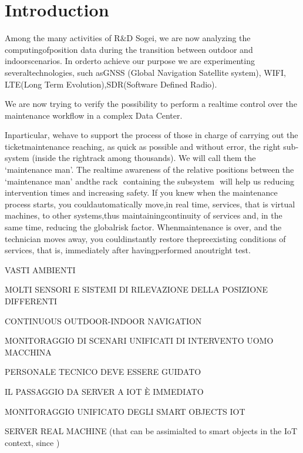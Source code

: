 \section{Introduction}\label{introduction}


Among the many activities of R\&D Sogei, we are now analyzing the
computingofposition data during the transition between outdoor and
indoorscenarios. In orderto achieve our purpose we are experimenting
severaltechnologies, such asGNSS (Global Navigation Satellite system), WI­FI,
LTE(Long Term Evolution),SDR(Software Defined Radio). 






We are now trying to
verify the possibility to perform a realtime control over the maintenance
workflow in a complex Data Center. 


Inparticular, wehave to support the process of those in charge of carrying out the ticket­maintenance reaching, as quick as possible and without error, the right sub­system
(inside the rightrack among thousands). We will call them the ‘maintenance man’. The real­time awareness of the relative positions between the ‘maintenance man' andthe rack ­ containing
the sub­system ­ will help us reducing intervention times and increasing safety.
If you knew when the maintenance process starts, you couldautomatically
move,in real time, services, that is virtual machines, to other systems,thus
maintainingcontinuity of services and, in the same time, reducing the
globalrisk factor. Whenmaintenance is over, and the technician moves away, you
couldinstantly restore thepre­existing conditions of services, that is,
immediately after havingperformed anoutright test.



VASTI AMBIENTI 



MOLTI SENSORI E SISTEMI DI RILEVAZIONE DELLA POSIZIONE DIFFERENTI

CONTINUOUS OUTDOOR-INDOOR NAVIGATION


MONITORAGGIO DI SCENARI UNIFICATI DI INTERVENTO UOMO MACCHINA


PERSONALE TECNICO DEVE ESSERE GUIDATO 



IL PASSAGGIO DA SERVER A IOT È IMMEDIATO


MONITORAGGIO UNIFICATO DEGLI SMART OBJECTS IOT






SERVER REAL MACHINE (that can be assimialted to smart objects in the IoT context, since )






